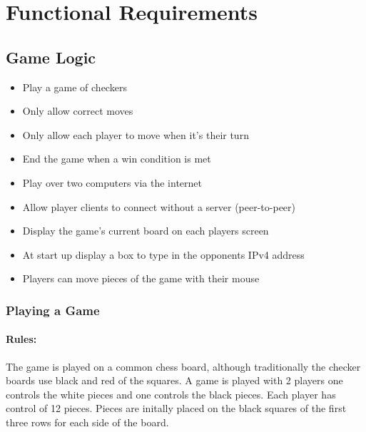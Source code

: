 \section{Functional Requirements}

\subsection{Game Logic}
\begin{itemize}
  \item Play a game of checkers
  \item Only allow correct moves
  \item Only allow each player to move when it's their turn
  \item End the game when a win condition is met
  \item Play over two computers via the internet
  \item Allow player clients to connect without a server (peer-to-peer)
  \item Display the game's current board on each players screen
  \item At start up display a box to type in the opponents IPv4 address
  \item Players can move pieces of the game with their mouse
\end{itemize}

\subsubsection{Playing a Game}
\paragraph{Rules:}
The game is played on a common chess board, although traditionally the checker
boards use black and red of the squares. A game is played with 2 players one
controls the white pieces and one controls the black pieces. Each player has
control of 12 pieces. Pieces are initally placed on the black squares of the
first three rows for each side of the board.

